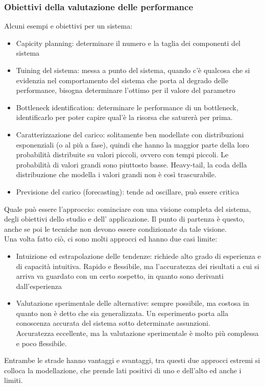 \documentclass{article}
\begin{document}
\subsubsection{Obiettivi della valutazione delle performance}
Alcuni esempi e obiettivi per un sistema:
\begin{itemize}
\item Capicity planning: determinare il numero e la taglia dei componenti del sistema
\item Tuining del sistema: messa a punto del sistema, quando c'è qualcosa che si evidenzia nel comportamento del sistema che porta al degrado delle performance, bisogna determinare l'ottimo per il valore del parametro
\item Bottleneck identification: determinare le performance di un bottleneck, identificarlo per poter capire qual'è la risorsa che saturerà per prima.
\item Caratterizzazione del carico: solitamente ben modellate con distribuzioni esponenziali (o al più a fase), quindi che hanno la maggior parte della loro probabilità distribuite su valori piccoli, ovvero con tempi piccoli. Le probabilità di valori grandi sono piuttosto basse. Heavy-tail, la coda della distribuzione che modella i valori grandi non è così trascurabile.
\item Previsione del carico (forecasting): tende ad oscillare, può essere critica 
\end{itemize}
Quale può essere l'approccio: cominciare con una visione completa del sistema, degli obiettivi dello studio e dell' applicazione. Il punto di partenza è questo, anche se poi le tecniche non devono essere condizionate da tale visione.\\ Una volta fatto ciò, ci sono molti approcci ed hanno due casi limite:
\begin{itemize}
\item Intuizione ed estrapolazione delle tendenze: richiede alto grado di esperienza e di capacità intuitiva. Rapido e flessibile, ma l'accuratezza dei risultati a cui si arriva va guardato con un certo sospetto, in quanto sono derivanti dall'esperienza
\item Valutazione sperimentale delle alternative: sempre possibile, ma costosa in quanto non è detto che sia generalizzata. Un esperimento porta alla conoscenza accurata del sistema sotto determinate assunzioni.\\ Accuratezza eccellente, ma la valutazione sperimentale è molto più complessa e poco flessibile.
\end{itemize}
Entrambe le strade hanno vantaggi e svantaggi, tra questi due approcci estremi si colloca la modellazione, che prende lati positivi di uno e dell'alto ed anche i limiti.
\end{document}
